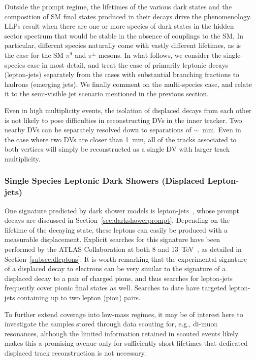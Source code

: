 Outside the prompt regime, the lifetimes of the various dark states and the composition of SM final states produced in their decays drive the phenomenology. LLPs result when there are one or more species of dark states in the hidden sector spectrum that would be stable in the absence of couplings to the SM. In particular, different species naturally come with vastly different lifetimes, as is the case for the SM $\pi^0$ and $\pi^\pm$ mesons. In what follows, we consider the single-species case in most detail, and treat the case of primarily leptonic decays (lepton-jets)  separately from the cases with substantial branching fractions to hadrons (emerging jets). We finally comment on the multi-species case, and relate it to the semi-visible jet scenario mentioned in the previous section.

Even in high multiplicity events, the isolation of displaced decays from each other is not likely to pose difficulties in reconstructing DVs in the inner tracker.  Two nearby DVs can be separately resolved down to separations of $\sim$~mm.  Even in the case where two DVs are closer than 1~mm, all of the tracks associated to both vertices will simply be reconstructed as a single DV with larger track multiplicity.

\subsubsection{Single Species Leptonic Dark Showers (Displaced Lepton-jets)}
\label{sec:leptonjetsoffline}
One signature predicted by dark shower models is lepton-jets~\cite{Falkowski:2010cm,Falkowski:2010gv}, whose prompt decays are discussed in Section~\ref{sec:darkshowerprompt}. Depending on the lifetime of the decaying state, these leptons can easily be produced with a measurable displacement. Explicit searches for this signature have been performed by the ATLAS Collaboration at both 8 and 13~TeV~\cite{Aad:2014yea, ATLAS-CONF-2016-042}, as detailed in Section~\ref{subsec:dleptons}. It is worth remarking that the experimental signature of a displaced decay to electrons can be very similar to the signature of a displaced decay to a pair of charged pions, and thus searches for lepton-jets frequently cover pionic final states as well. Searches to date have targeted lepton-jets containing up to two lepton (pion) pairs.

To further extend coverage into low-mass regimes, it may be of interest here to investigate the samples stored through data scouting for, e.g., di-muon resonances, although the limited information retained in scouted events likely makes this a promising avenue only for sufficiently short lifetimes that dedicated displaced track reconstruction is not necessary.

